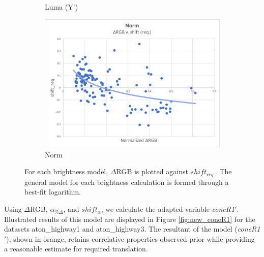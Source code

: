 \begin{figure}
\begin{subfigure}{.49\linewidth}
  \caption{Luma (Y')}
\end{subfigure}
\hfill
\begin{subfigure}{.49\linewidth}
  \includegraphics[width=1\linewidth]{figures/model/scatter/model_norm.jpg}
  \caption{Norm}
\end{subfigure}

\caption{For each brightness model, $\Delta$RGB is plotted against $shift_{req.}$. The general model for each brightness calculation is formed through a best-fit logarithm.}
\label{fig:model_scatter}
\end{figure}

Using $\Delta$RGB, $\alpha_{\%\Delta}$, and $shift_{\alpha}$, we calculate the adapted variable \textit{coneR1}$'$. Illustrated results of this model are displayed in Figure \ref{fig:new_coneR1} for the datasets aton\_highway1 and aton\_highway3. The resultant of the model (\textit{coneR1}$'$), shown in orange, retains correlative properties observed prior while providing a reasonable estimate for required translation.

